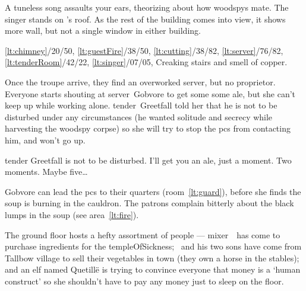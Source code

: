 \documentclass[10pt,twoside]{book}
\begin{document}

\begin{boxtext}
  A tuneless song assaults your ears, theorizing about how \glspl{woodspy} mate.
  The singer stands on 's roof.
  As the rest of the building comes into view, it shows more wall, but not a single window in either building.
\end{boxtext}

%
  {%
    \ref{lt:chimney}/20/50,
    \ref{lt:guestFire}/38/50,
    \ref{lt:cutting}/38/82,
    \ref{lt:server}/76/82,
    \ref{lt:tenderRoom}/42/22,
    \ref{lt:singer}/07/05,
  }%
  {Creaking stairs and smell of copper.}

Once the troupe arrive, they find an overworked \gls{server}, but no proprietor.
Everyone starts shouting at \gls{server}~Gobvore to get some some ale, but she can't keep up while working alone.
\Gls{tender}~Greetfall told her that he is not to be disturbed under any circumstances (he wanted solitude and secrecy while \gls{harvesting} the \gls{woodspy} corpse) so she will try to stop the \glspl{pc} from contacting him, and won't go up.

\begin{speechtext}
  \Gls{tender} Greetfall is not to be disturbed.
  I'll get you an ale, just a moment.
  Two moments.
  Maybe five\ldots
\end{speechtext}


Gobvore can lead the \glspl{pc} to their quarters (room~\vref{lt:guard}), before she finds the soup is burning in the cauldron.
The patrons complain bitterly about the black lumps in the soup (see area~\vref{lt:fire}).

The ground floor hosts a hefty assortment of people --- \gls{mixer}~\composeHumanName\ has come to purchase \glspl{ingredient} for the \gls{templeOfSickness}; \composeHumanName\ and his two sons have come from Tallbow \gls{village} to sell their vegetables in town (they own a horse in the stables); and an elf named Quetill\"e is trying to convince everyone that money is a `human construct' so she shouldn't have to pay any money just to sleep on the floor.
\end{document}
